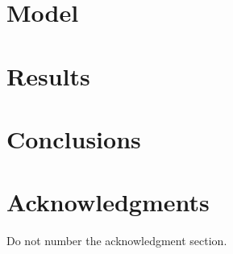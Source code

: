 \documentclass[11pt,letterpaper]{article}
\begin{document}
\section{Model}

\section{Results}

\section{Conclusions}


\section*{Acknowledgments}

Do not number the acknowledgment section.



\end{document}
